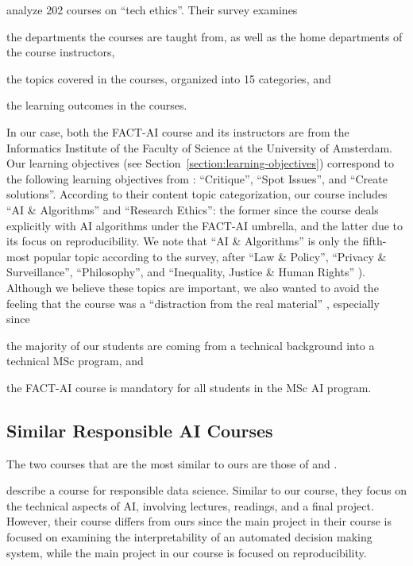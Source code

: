 \documentclass[letterpaper]{article}
\newcommand{\OurUniversity}{the University of Amsterdam}
\begin{document}
\citet{fiesler2020we} analyze 202 courses on ``tech ethics''. 
Their survey examines 
\begin{enumerate*}[label=(\roman*)]
\item the departments the courses are taught from, as well as the home departments of the course instructors, 
\item the topics covered in the courses, organized into 15 categories, and 
\item the learning outcomes in the courses. 
\end{enumerate*}
In our case, both the FACT-AI course and its instructors are from the Informatics Institute of the Faculty of Science at \OurUniversity{}. Our learning objectives (see Section~\ref{section:learning-objectives}) correspond to the following learning objectives from \citet{fiesler2020we}: ``Critique'', ``Spot Issues'', and ``Create solutions''. 
According to their content topic categorization, our course includes ``AI \& Algorithms'' and ``Research Ethics'': the former since the course deals explicitly with \ac{AI} algorithms under the FACT-AI umbrella, and the latter due to its focus on reproducibility. 
We note that ``AI \& Algorithms'' is only the fifth-most popular topic according to the survey, after ``Law \& Policy'', ``Privacy \& Surveillance'', ``Philosophy'', and ``Inequality, Justice \& Human Rights'' \citep[see Table 2,][]{fiesler2020we}). 
Although we believe these topics are important, we also wanted to avoid the feeling that the course was a ``distraction from the real material'' \cite{lewis2021teaching}, especially since 
\begin{enumerate*}[label=(\roman*)]
\item the majority of our students are coming from a technical background into a technical MSc program, and 
\item the FACT-AI course is mandatory for all students in the MSc AI program. 
\end{enumerate*}

\subsection{Similar Responsible AI Courses}
The two courses that are the most similar to ours are those of \citet{lewis2021teaching} and \citet{yildiz2021reproducedpapers}. 

\citet{lewis2021teaching} describe a course for responsible data science. 
Similar to our course, they focus on the technical aspects of AI, involving lectures, readings, and a final project. 
However, their course differs from ours since the main project in their course is focused on examining the interpretability of an automated decision making system, while the main project in our course is focused on reproducibility. 
\end{document}
